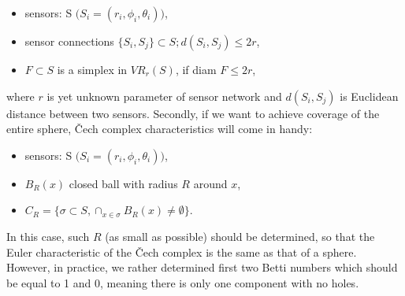 \documentclass[a4paper, 12pt]{article}
\begin{document}
\begin{itemize}
	\item {sensors: S $\big(S_i = (r_i, \phi_i, \theta_i)\big)$,}
	\item {sensor connections $\{S_i, S_j\} \subset S; d(S_i, S_j) \leq 2r$,}
	\item {$F \subset S$ is a simplex in $VR_r(S)$, if diam $F \leq 2r$,}
\end{itemize} 
where $r$ is yet unknown parameter of sensor network and $d(S_i, S_j)$ is Euclidean distance between two sensors. 
Secondly, if we want to achieve coverage of the entire sphere, Čech complex characteristics will come in handy:

\begin{itemize}
	\item {sensors: S $\big(S_i = (r_i, \phi_i, \theta_i)\big)$,}
	\item {$B_R(x)$ closed ball with radius $R$ around $x$,}
	\item {$C_R = \{\sigma \subset S,\cap_{x\in \sigma}B_R(x) \neq \emptyset \}$.
	}
\end{itemize}
In this case, such $R$ (as small as possible) should be determined, so that the Euler characteristic of the Čech complex is the same as that of a sphere. However, in practice, we rather determined first two Betti numbers which should be equal to 1 and 0, meaning there is only one component with no holes. 
\clearpage
\end{document}
